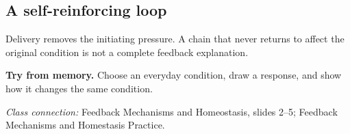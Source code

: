 \documentclass[11pt,letterpaper]{article}
\newcommand{\memorycheck}[1]{\par\smallskip\textbf{Try from memory.} #1\par}
\newcommand{\ico}[3][forest]{{\fontsize{#3}{#3}\selectfont\textcolor{#1}{#2}}}
\newcommand{\pn}[3]{\ico[#1]{#2}{19pt}\\[2pt]#3}
\newcommand{\classsource}[1]{{\footnotesize\textit{Class connection:} #1\par}}
\begin{document}
\subsection*{A self-reinforcing loop}
\begin{center}
\par
\end{center}
Delivery removes the initiating pressure. A chain that never returns to affect the original condition is not a complete feedback explanation.
\memorycheck{Choose an everyday condition, draw a response, and show how it changes the same condition.}
\classsource{Feedback Mechanisms and Homeostasis, slides 2--5; Feedback Mechanisms and Homestasis Practice.}
\end{document}
